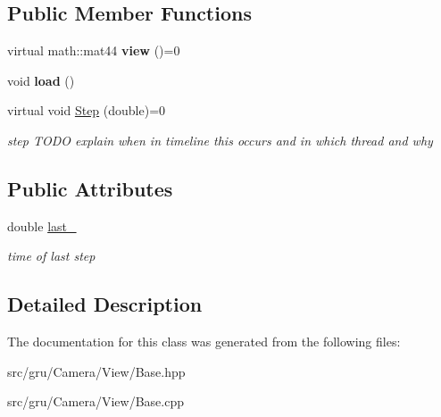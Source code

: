 \subsection*{\-Public \-Member \-Functions}
\begin{DoxyCompactItemize}
\item 
\hypertarget{classglutpp_1_1Camera_1_1View_1_1Base_ae4f66f3d8976c8a611132f52ffd8a33a}{virtual math\-::mat44 {\bfseries view} ()=0}\label{classglutpp_1_1Camera_1_1View_1_1Base_ae4f66f3d8976c8a611132f52ffd8a33a}

\item 
\hypertarget{classglutpp_1_1Camera_1_1View_1_1Base_aa50111a2f1afe732fb01a073b35cc0c0}{void {\bfseries load} ()}\label{classglutpp_1_1Camera_1_1View_1_1Base_aa50111a2f1afe732fb01a073b35cc0c0}

\item 
\hypertarget{classglutpp_1_1Camera_1_1View_1_1Base_ade8b42ca481fca70f89a1cbf357bbbb7}{virtual void \hyperlink{classglutpp_1_1Camera_1_1View_1_1Base_ade8b42ca481fca70f89a1cbf357bbbb7}{\-Step} (double)=0}\label{classglutpp_1_1Camera_1_1View_1_1Base_ade8b42ca481fca70f89a1cbf357bbbb7}

\begin{DoxyCompactList}\small\item\em step \-T\-O\-D\-O explain when in timeline this occurs and in which thread and why \end{DoxyCompactList}\end{DoxyCompactItemize}
\subsection*{\-Public \-Attributes}
\begin{DoxyCompactItemize}
\item 
\hypertarget{classglutpp_1_1Camera_1_1View_1_1Base_a2f131c109db4a70bbfdf9fdf38891e52}{double \hyperlink{classglutpp_1_1Camera_1_1View_1_1Base_a2f131c109db4a70bbfdf9fdf38891e52}{last\-\_\-}}\label{classglutpp_1_1Camera_1_1View_1_1Base_a2f131c109db4a70bbfdf9fdf38891e52}

\begin{DoxyCompactList}\small\item\em time of last step \end{DoxyCompactList}\end{DoxyCompactItemize}


\subsection{\-Detailed \-Description}


\-The documentation for this class was generated from the following files\-:\begin{DoxyCompactItemize}
\item 
src/gru/\-Camera/\-View/\-Base.\-hpp\item 
src/gru/\-Camera/\-View/\-Base.\-cpp\end{DoxyCompactItemize}
